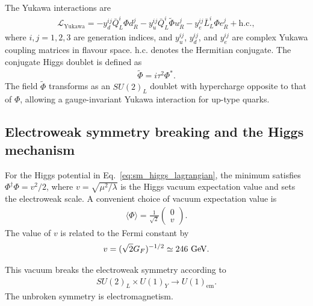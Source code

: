 The Yukawa interactions are
\begin{align*}
    \mathcal{L}_{\mathrm{Yukawa}}
    =
    -
    y_{d}^{ij}\bar{Q}_{L}^{i}\Phi d_{R}^{j}
    -
    y_{u}^{ij}\bar{Q}_{L}^{i}\tilde{\Phi} u_{R}^{j}
    -
    y_{e}^{ij}\bar{L}_{L}^{i}\Phi e_{R}^{j}
    +
    \mathrm{h.c.},
\end{align*}
where $i,j=1,2,3$ are generation indices, and $y_{u}^{ij}$, $y_{d}^{ij}$, and $y_{e}^{ij}$ are complex Yukawa coupling matrices in flavour space. 
$\mathrm{h.c.}$ denotes the Hermitian conjugate. 
The conjugate Higgs doublet is defined as
\begin{align*}
    \tilde{\Phi}
    =
    i\tau^{2}\Phi^{*}.
\end{align*}
The field $\tilde{\Phi}$ transforms as an $SU(2)_{L}$ doublet with hypercharge opposite to that of $\Phi$, allowing a gauge-invariant Yukawa interaction for up-type quarks.

\subsection{Electroweak symmetry breaking and the Higgs mechanism}
\label{subsec:ewsb}

For the Higgs potential in Eq.~\eqref{eq:sm_higgs_lagrangian}, the minimum satisfies $\Phi^{\dagger}\Phi=v^{2}/2$, where $v=\sqrt{\mu^{2}/\lambda}$ is the Higgs vacuum expectation value and sets the electroweak scale. 
A convenient choice of vacuum expectation value is
\begin{align}
    \langle\Phi\rangle
    =
    \frac{1}{\sqrt{2}}
    \begin{pmatrix}
        0 \\
        v
    \end{pmatrix}.
    \label{eq:higgs_vev}
\end{align}
The value of $v$ is related to the Fermi constant by~\cite{PDG2024}
\begin{align*}
    v=(\sqrt{2}G_{F})^{-1/2}\simeq 246~\mathrm{GeV}.
\end{align*}

This vacuum breaks the electroweak symmetry according to
\begin{align*}
    SU(2)_{L}\times U(1)_{Y}
    \rightarrow
    U(1)_{\mathrm{em}}.
\end{align*}
The unbroken symmetry is electromagnetism.

